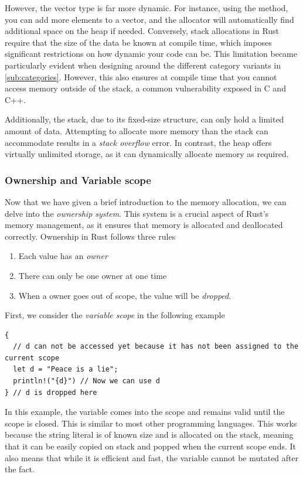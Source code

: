 \documentclass[twoside,11pt]{report}
\theoremstyle{definition}
\theoremstyle{plain}
\begin{document}
However, the vector type is far more dynamic. For instance, using the  method, you can add more elements to a vector, and the allocator will automatically find additional space on the heap if needed. Conversely, stack allocations in Rust require that the size of the data be known at compile time, which imposes significant restrictions on how dynamic your code can be. This limitation became particularly evident when designing around the different category variants in \autoref{sub:categories}. However, this also ensures at compile time that you cannot access memory outside of the stack, a common vulnerability exposed in C and C++.

Additionally, the stack, due to its fixed-size structure, can only hold a limited amount of data. Attempting to allocate more memory than the stack can accommodate results in a \textit{stack overflow} error. In contrast, the heap offers virtually unlimited storage, as it can dynamically allocate memory as required.

\subsubsection{Ownership and Variable scope}
Now that we have given a brief introduction to the memory allocation, we can delve into the \textit{ownership system}. This system is a crucial aspect of Rust's memory management, as it ensures that memory is allocated and deallocated correctly. Ownership in Rust follows three rules
\begin{enumerate}[parsep=0pt, itemsep=0pt]
  \item Each value has an \textit{owner}
  \item There can only be one owner at one time
  \item When a owner goes out of scope, the value will be \textit{dropped}.
\end{enumerate}
First, we consider the \textit{variable scope} in the following example
\begin{verbatim}
{
  // d can not be accessed yet because it has not been assigned to the current scope
  let d = "Peace is a lie";
  println!("{d}") // Now we can use d
} // d is dropped here
\end{verbatim}
In this example, the variable  comes into the scope and remains valid until the scope is closed. This is similar to most other programming languages. This works because the string literal  is of known size and is allocated on the stack, meaning that it can be easily copied on stack and popped when the current scope ends. It also means that while it is efficient and fast, the variable  cannot be mutated after the fact.
\end{document}
